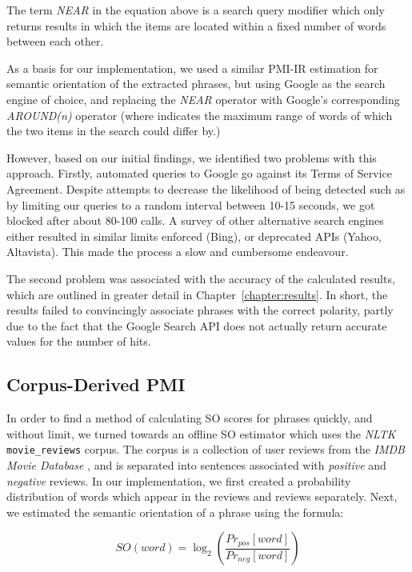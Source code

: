 \documentclass[11pt]{report} %
\begin{document}
The term \textit{NEAR} in the equation above is a search query modifier which only returns results in which the items are located within a fixed number of words between each other. 

As a basis for our implementation, we used a similar PMI-IR estimation for semantic orientation of the extracted phrases, but using Google as the search engine of choice, and replacing the \textit{NEAR} operator with Google's corresponding \textit{AROUND(n)} operator (where  indicates the maximum range of words of which the two items in the search could differ by.)

However, based on our initial findings, we identified two problems with this approach. Firstly, automated queries to Google go against its Terms of Service Agreement. Despite attempts to decrease the likelihood of being detected such as by limiting our queries to a random interval between 10-15 seconds, we got blocked after about 80-100 calls. A survey of other alternative search engines either resulted in similar limits enforced (Bing), or deprecated APIs (Yahoo, Altavista). This made the process a slow and cumbersome endeavour.

The second problem was associated with the accuracy of the calculated results, which are outlined in greater detail in Chapter~\ref{chapter:results}. In short, the results failed to convincingly associate phrases with the correct polarity, partly due to the fact that the Google Search API does not actually return accurate values for the number of hits.

\subsection{Corpus-Derived PMI}
In order to find a method of calculating SO scores for phrases quickly, and without limit, we turned towards an offline SO estimator which uses the \textit{NLTK} \verb|movie_reviews| corpus. The corpus is a collection of user reviews from the \textit{IMDB Movie Database} , and is separated into sentences associated with \textit{positive} and \textit{negative} reviews. In our implementation, we first created a probability distribution of words which appear in the  reviews and  reviews separately. Next, we estimated the semantic orientation of a phrase using the formula:

\begin{equation*} SO(word) = \log_2 \left(\frac{Pr_{pos}[word]}{Pr_{neg}[word]}\right) \end{equation*}
\end{document}
